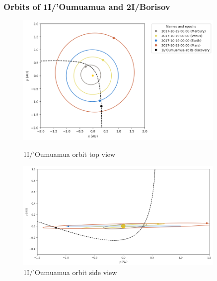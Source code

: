 \documentclass[xcolor={dvipsnames}]{beamer}
\begin{document}
\begin{frame}
\frametitle{Orbits of 1I/'Oumuamua and 2I/Borisov}

\begin{figure}
    \centering
    \begin{minipage}{0.45\textwidth}
        \centering
        \includegraphics[width=0.9\textwidth]{fig/static/oumuamua/orbit_xy.png}
        \caption{1I/'Oumuamua orbit top view}
        \label{fig:figure1}
    \end{minipage}
    \hfill
    \begin{minipage}{0.45\textwidth}
        \centering
        \includegraphics[width=0.9\textwidth]{fig/static/oumuamua/orbit_yz.png}
        \caption{1I/'Oumuamua orbit side view}
        \label{fig:figure2}
    \end{minipage}
\end{figure}

\vspace{-0.35cm}


\end{frame}
\end{document}
